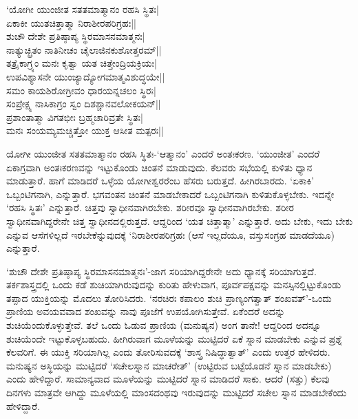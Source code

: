 \begin{shloka}
`ಯೋಗೀ ಯುಂಜೀತ ಸತತಮಾತ್ಮಾನಂ ರಹಸಿ ಸ್ಥಿತಃ|\\
ಏಕಾಕೀ ಯುತಚಿತ್ತಾತ್ಮಾ ನಿರಾಶೀರಪರಿಗ್ರಹಃ||\\
ಶುಚೌ ದೇಶೇ ಪ್ರತಿಷ್ಠಾಪ್ಯ ಸ್ಥಿರಮಾಸನಮಾತ್ಮನಃ|\\
ನಾತ್ಯುಚ್ಛ್ರಿತಂ ನಾತಿನೀಚಂ ಚೈಲಾಜಿನಕುಶೋತ್ತರಮ್||\\
ತತ್ರೈಕಾಗ್ರ್ಯಂ ಮನಃ ಕೃತ್ವಾ ಯತ ಚಿತ್ತೇಂದ್ರಿಯಕ್ರಿಯಃ|\\
ಉಪವಿಶ್ಯಾಸನೇ ಯುಂಜ್ಯಾದ್ಯೋಗಮಾತ್ಮವಿಶುದ್ಧಯೇ||\\
ಸಮಂ ಕಾಯಶಿರೋಗ್ರೀವಂ ಧಾರಯನ್ನಚಲಂ ಸ್ಥಿರಃ|\\
ಸಂಪ್ರೇಕ್ಷ್ಯ ನಾಸಿಕಾಗ್ರಂ ಸ್ವಂ ದಿಶಶ್ಚಾನವಲೋಕಯನ್||\\
ಪ್ರಶಾಂತಾತ್ಮಾ ವಿಗತಭೀಃ ಬ್ರಹ್ಮಚಾರಿವ್ರತೇ ಸ್ಥಿತಃ|\\
ಮನಃ ಸಂಯಮ್ಯಮಚ್ಚಿತ್ತೋ ಯುಕ್ತ ಆಸೀತ ಮತ್ಪರಃ||
\end{shloka}

ಯೋಗೀ ಯುಂಜೀತ ಸತತಮಾತ್ಮಾನಂ ರಹಸಿ ಸ್ಥಿತಃ-`ಆತ್ಮಾನಂ' ಎಂದರೆ ಅಂತಃಕರಣ. `ಯುಂಜೀತ' ಎಂದರೆ ಏಕಾಗ್ರವಾಗಿ ಅಂತಃಕರಣವನ್ನು ಇಟ್ಟುಕೊಂಡು ಚಿಂತನೆ ಮಾಡುವುದು. ಕೆಲವರು ಸಭೆಯಲ್ಲಿ ಕುಳಿತು ಧ್ಯಾನ ಮಾಡುತ್ತಾರೆ. ಹಾಗೆ ಮಾಡಿದರೆ ಒಳ್ಳೆಯ ಯೋಗೀಶ್ವರರೆಂಬ ಹೆಸರು ಬರುತ್ತದೆ. ಹೀಗಿರಬಾರದು. `ಏಕಾಕಿ' ಒಬ್ಬಂಟಿಗನಾಗಿ, ಎನ್ನುತ್ತಾರೆ. ಭಗವಂತನ ಚಿಂತನೆ ಮಾಡಬೇಕಾದರೆ ಒಬ್ಬಂಟಿಗನಾಗಿ ಕುಳಿತುಕೊಳ್ಳಬೇಕು. ಇದನ್ನೇ `ರಹಸಿ ಸ್ಥಿತಃ' ಎನ್ನುತ್ತಾರೆ. ಚಿತ್ತವು ಸ್ವಾಧೀನವಾಗಿರಬೇಕು. ಶರೀರವೂ ಸ್ವಾಧೀನವಾಗಿರಬೇಕು. ಶರೀರ ಸ್ವಾಧೀನವಾಗಿದ್ದರೇನೇ ಚಿತ್ತ ಸ್ವಾಧೀನದಲ್ಲಿರುತ್ತದೆ. ಆದ್ದರಿಂದ `ಯತ ಚಿತ್ತಾತ್ಮಾ' ಎನ್ನುತ್ತಾರೆ. ಅದು ಬೇಕು, ಇದು ಬೇಕು ಎನ್ನುವ ಆಸೆಗಳಿಲ್ಲದೆ ಇರಬೇಕೆನ್ನುವುದಕ್ಕೆ `ನಿರಾಶೀರಪರಿಗ್ರಹಃ (ಆಸೆ ಇಲ್ಲದೆಯೂ, ವಸ್ತುಸಂಗ್ರಹ ಮಾಡದೆಯೂ) ಎನ್ನುತ್ತಾರೆ.

`ಶುಚೌ ದೇಶೇ ಪ್ರತಿಷ್ಠಾಪ್ಯ ಸ್ಥಿರಮಾಸನಮಾತ್ಮನಃ'-ಜಾಗ ಸರಿಯಾಗಿದ್ದರೇನೇ ಅದು ಧ್ಯಾನಕ್ಕೆ ಸರಿಯಾಗುತ್ತದೆ. ತರ್ಕಶಾಸ್ತ್ರದಲ್ಲಿ ಒಂದು ಕಡೆ ಶುಚಿಯಾಗಿರುವುದನ್ನು ಕುರಿತು ಹೇಳುವಾಗ, ಪೂರ್ವಪಕ್ಷವನ್ನು ಮನಸ್ಸಿನಲ್ಲಿಟ್ಟುಕೊಂಡು ತಪ್ಪಾದ ಯುಕ್ತಿಯನ್ನು ಮೊದಲು ತೋರಿಸಿದರು. `ನರಚಿರಃ ಕಪಾಲಂ ಶುಚಿ ಪ್ರಾಣ್ಯಂಗತ್ವಾತ್ ಶಂಖವತ್'-ಒಂದು ಪ್ರಾಣಿಯ ಅವಯವವಾದ ಶಂಖವನ್ನು ನಾವು ಪೂಜೆಗೆ ಉಪಯೋಗಿಸುತ್ತೇವೆ. ಏಕೆಂದರೆ ಅದನ್ನು ಶುಚಿಯೆಂದುಕೊಳ್ಳುತ್ತೇವೆ. ತಲೆ ಒಂದು ಓಡುವ ಪ್ರಾಣಿಯ (ಮನುಷ್ಯನ) ಅಂಗ ತಾನೇ! ಆದ್ದರಿಂದ ಅದನ್ನೂ ಶುಚಿಯೆಂದೇ ಇಟ್ಟುಕೊಳ್ಳಬಹುದು. ಹೀಗಿರುವಾಗ ಮೂಳೆಯನ್ನು ಮುಟ್ಟಿದರೆ ಏಕೆ ಸ್ನಾನ ಮಾಡಬೇಕು ಎನ್ನುವ ಪ್ರಶ್ನೆ ಕೆಲವರಿಗೆ. ಈ ಯುಕ್ತಿ ಸರಿಯಾಗಿಲ್ಲ ಎಂದು ತೋರಿಸುವದಕ್ಕೆ `ಶಾಸ್ತ್ರ ನಿಷಿದ್ಧಾತ್ವಾತ್' ಎಂದು ಉತ್ತರ ಹೇಳಿದರು. ಮನುಷ್ಯನ ಅಸ್ಥಿಯನ್ನು ಮುಟ್ಟಿದರೆ `ಸಚೇಲಸ್ನಾನ ಮಾಚರೇತ್' (ಉಟ್ಟಿರುವ ಬಟ್ಟೆಯೊಡನೆ ಸ್ನಾನ ಮಾಡಬೇಕು) ಎಂದು ಹೇಳಿದ್ದಾರೆ. ಸಾಮಾನ್ಯವಾದ ಮೂಳೆಯನ್ನು ಮುಟ್ಟಿದರೆ ಸ್ನಾನ ಮಾಡಿದರೆ ಸಾಕು. ಆದರೆ (ಸತ್ತು) ಕೆಲವು ದಿನಗಳು ಮಾತ್ರವೇ ಆಗಿದ್ದು ಮೂಳೆಯಲ್ಲಿ ಮಾಂಸದಂಥವು ಇರುವುದನ್ನು ಮುಟ್ಟಿದರೆ ಸಚೇಲ ಸ್ನಾನ ಮಾಡಬೇಕೆಂದು ಹೇಳಿದ್ದಾರೆ.

